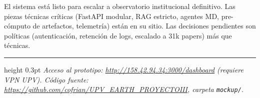 \documentclass[11pt,a4paper]{article}
\newcommand{\file}[1]{\texttt{\small #1}}
\begin{document}
El sistema está listo para escalar a observatorio institucional definitivo. Las piezas técnicas críticas (FastAPI modular, RAG estricto, agentes MD, pre-cómputo de artefactos, telemetría) están en su sitio. Las decisiones pendientes son políticas (autenticación, retención de logs, escalado a 31k papers) más que técnicas.

\vfill
\hrule height 0.3pt
\medskip
\small\textit{Acceso al prototipo: \url{http://158.42.94.34:3000/dashboard} (requiere VPN UPV). Código fuente: \url{https://github.com/cofrian/UPV_EARTH_PROYECTOIII}, carpeta \file{mockup/}.}
\end{document}
